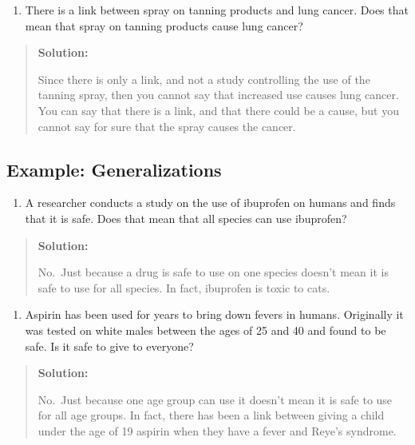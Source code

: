 \documentclass[]{book}
\providecommand{\tightlist}{%
  \setlength{\itemsep}{0pt}\setlength{\parskip}{0pt}}
\begin{document}
\begin{enumerate}
\def\labelenumi{\alph{enumi}.}
\setcounter{enumi}{1}
\tightlist
\item
  There is a link between spray on tanning products and lung cancer. Does that mean that spray on tanning products cause lung cancer?
\end{enumerate}

\begin{quote}
\textbf{Solution:}

Since there is only a link, and not a study controlling the use of the tanning spray, then you cannot say that increased use causes lung cancer. You can say that there is a link, and that there could be a cause, but you cannot say for sure that the spray causes the cancer.
\end{quote}

\hypertarget{example-generalizations}{%
\subsection{Example: Generalizations}\label{example-generalizations}}

\begin{enumerate}
\def\labelenumi{\alph{enumi}.}
\tightlist
\item
  A researcher conducts a study on the use of ibuprofen on humans and finds that it is safe. Does that mean that all species can use ibuprofen?
\end{enumerate}

\begin{quote}
\textbf{Solution:}

No.~Just because a drug is safe to use on one species doesn't mean it is safe to use for all species. In fact, ibuprofen is toxic to cats.
\end{quote}

\begin{enumerate}
\def\labelenumi{\alph{enumi}.}
\setcounter{enumi}{1}
\tightlist
\item
  Aspirin has been used for years to bring down fevers in humans. Originally it was tested on white males between the ages of 25 and 40 and found to be safe. Is it safe to give to everyone?
\end{enumerate}

\begin{quote}
\textbf{Solution:}

No.~Just because one age group can use it doesn't mean it is safe to use for all age groups. In fact, there has been a link between giving a child under the age of 19 aspirin when they have a fever and Reye's syndrome.
\end{quote}
\end{document}
